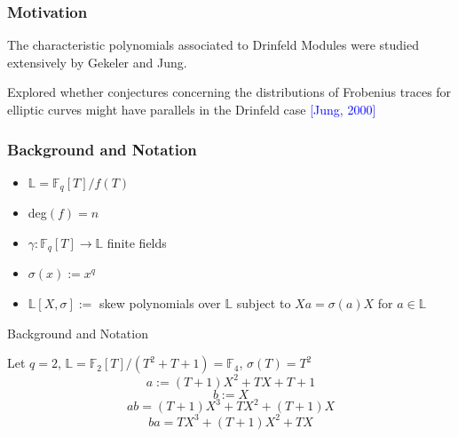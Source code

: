 \documentclass{beamer}
\newcommand{\f}{\mathbb{F}}
\newcommand{\blue}{\textcolor{blue}}
\begin{document}

\begin{frame}

\frametitle{Motivation}

\item The characteristic polynomials associated to Drinfeld Modules were studied extensively by Gekeler and Jung. 

\item Explored whether conjectures concerning the distributions of Frobenius traces for elliptic curves might have parallels in the Drinfeld case \blue{[Jung, 2000]}


    
\end{frame}




\begin{frame}
\frametitle{Background and Notation}

\begin{itemize}

\item $\mathbb{L} = \mathbb{F}_q[T]/f(T)$
\item deg$(f) = n$
\item $\gamma: \mathbb{F}_q[T] \to \mathbb{L}$ finite fields
\item $\sigma(x) := x^q$
\item $\mathbb{L}[X,\sigma] := $ skew polynomials over $\mathbb{L}$ subject to $Xa = \sigma(a)X$ for $a \in \mathbb{L}$ 

\end{itemize}
\end{frame}
\begin{frame}{Background and Notation}


\begin{example}
Let $q = 2$, $\mathbb{L} = \mathbb{F}_2[T]/(T^2 + T + 1) = \mathbb{F}_4$, $\sigma(T) = T^2$
\[ a:= (T + 1)X^2 + TX + T + 1 \]
\[b := X\]
\[ab = (T + 1)X^3 + TX^2 + (T + 1)X\]
\[ba = TX^3 + (T+1)X^2 + TX \]
\end{example}



\end{frame}
\end{document}
